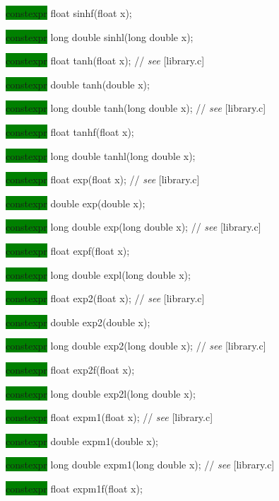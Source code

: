 \documentclass[prd,twocolumn,amsmath,amssymb,nofootinbib,eqsecnum]{revtex4-1}
\newcommand{\highlight}[1]{\colorbox{green}{\!\!\!\! #1}}
\newcommand{\stdcomment}[1]{{// {\it see} [#1]}}
\begin{document}
{\highlight{constexpr} float sinhf(float x);

\highlight{constexpr} long double sinhl(long double x);

\vspace{2ex}


\highlight{constexpr} float tanh(float x); \stdcomment{library.c}

\highlight{constexpr} double tanh(double x);

\highlight{constexpr} long double tanh(long double x); \stdcomment{library.c}

\highlight{constexpr} float tanhf(float x);

\highlight{constexpr} long double tanhl(long double x);

\vspace{2ex}


\highlight{constexpr} float exp(float x); \stdcomment{library.c}

\highlight{constexpr} double exp(double x);

\highlight{constexpr} long double exp(long double x); \stdcomment{library.c}

\highlight{constexpr} float expf(float x);

\highlight{constexpr} long double expl(long double x);

\vspace{2ex}


\highlight{constexpr} float exp2(float x); \stdcomment{library.c}

\highlight{constexpr} double exp2(double x);

\highlight{constexpr} long double exp2(long double x); \stdcomment{library.c}

\highlight{constexpr} float exp2f(float x);

\highlight{constexpr} long double exp2l(long double x);

\vspace{2ex}


\highlight{constexpr} float expm1(float x); \stdcomment{library.c}

\highlight{constexpr} double expm1(double x);

\highlight{constexpr} long double expm1(long double x); \stdcomment{library.c}

\highlight{constexpr} float expm1f(float x);

}
\end{document}
